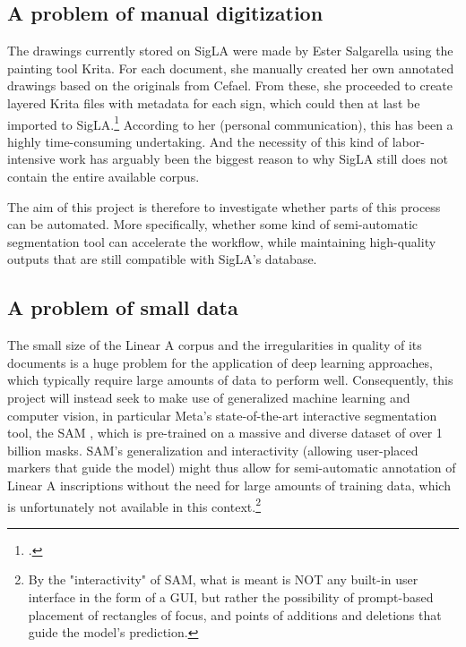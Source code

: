 \subsection{A problem of manual digitization}

The drawings currently stored on SigLA were made by Ester Salgarella using the painting tool Krita.
For each document, she manually created her own annotated drawings based on the originals from \acs{Cefael}.
From these, she proceeded to create layered Krita files with metadata for each sign, which could then at last be imported to SigLA.\footcite{SalgarellaCastellanSigLA2020}
According to her (personal communication), this has been a highly time-consuming undertaking. 
And the necessity of this kind of labor-intensive work has arguably been the biggest reason to why SigLA still does not contain the entire available corpus.

The aim of this project is therefore to investigate whether parts of this process can be automated. More specifically, whether some kind of semi-automatic segmentation tool 
can accelerate the workflow, while maintaining high-quality outputs that are still compatible with SigLA's database.

\subsection{A problem of small data}
The small size of the Linear A corpus and the irregularities in quality of its documents is a huge problem for the application of deep learning approaches, which typically require large amounts of data to perform well.
Consequently, this project will instead seek to make use of generalized machine learning and computer vision, in particular Meta's state-of-the-art interactive segmentation tool, the \acf{SAM} \parencite{sam}, which is pre-trained on a massive and diverse dataset of over 1 billion masks.
\acs{SAM}'s generalization and interactivity (allowing user-placed markers that guide the model) might thus allow for semi-automatic annotation of Linear A inscriptions without the need for large amounts of training data, which is unfortunately not available in this context.\footnote{By the "interactivity" of \acs{SAM}, what is meant is NOT any built-in user interface in the form of a GUI, but rather the possibility of prompt-based placement of rectangles of focus, and points of additions and deletions that guide the model's prediction.}

\cleardoublepage

